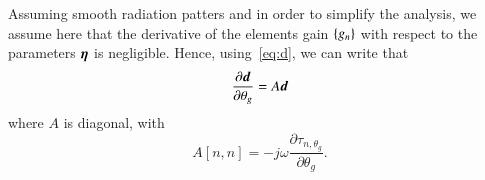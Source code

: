Assuming smooth radiation patters and in order to simplify the analysis, we assume here that the derivative of the elements gain $\left\{{g_n}\right\}$ with respect to the parameters $\boldsymbol{\eta}$ is negligible. Hence, using~\eqref{eq:d}, we can write that
$$
\frac{\partial\boldsymbol{d}}{\partial\theta_g}=A\boldsymbol{d}
$$
where $A$ is diagonal, with \[A[n,n]=-j\omega\frac{\partial \tau_{n,\theta_g}}{\partial{\theta_g}}.
\]

